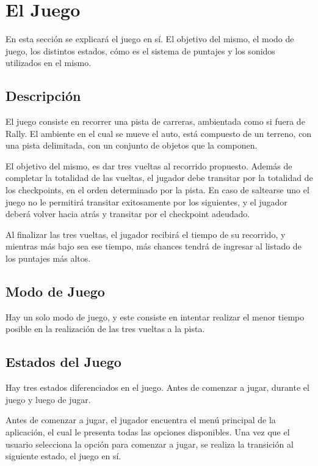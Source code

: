 \documentclass[a4paper,10pt]{article}
\begin{document}
\section{El Juego}
\label{el_juego}

En esta sección se explicará el juego en sí.  El objetivo del mismo, el modo de
juego, los distintos estados, cómo es el sistema de puntajes y los sonidos
utilizados en el mismo.

\subsection{Descripción}
El juego consiste en recorrer una pista de carreras, ambientada como si fuera
de Rally.  El ambiente en el cual se mueve el auto, está compuesto de un
terreno, con una pista delimitada, con un conjunto de objetos que la componen.

El objetivo del mismo, es dar tres vueltas al recorrido propuesto.  Además de
completar la totalidad de las vueltas, el jugador debe transitar por la
totalidad de los checkpoints, en el orden determinado por la pista.  En caso de
saltearse uno el juego no le permitirá transitar exitosamente por los
siguientes, y el jugador deberá volver hacia atrás y transitar por el
checkpoint adeudado.

Al finalizar las tres vueltas, el jugador recibirá el tiempo de su recorrido, y
mientras más bajo sea ese tiempo, más chances tendrá de ingresar al listado de
los puntajes más altos.
\subsection{Modo de Juego}
Hay un solo modo de juego, y este consiste en intentar realizar el menor tiempo
posible en la realización de las tres vueltas a la pista.
\subsection{Estados del Juego}
Hay tres estados diferenciados en el juego.  Antes de comenzar a jugar, durante
el juego y luego de jugar.

Antes de comenzar a jugar, el jugador encuentra el menú principal de la
aplicación, el cual le presenta todas las opciones disponibles.  Una vez que el
usuario selecciona la opción para comenzar a jugar, se realiza la transición al
siguiente estado, el juego en sí.
\end{document}
